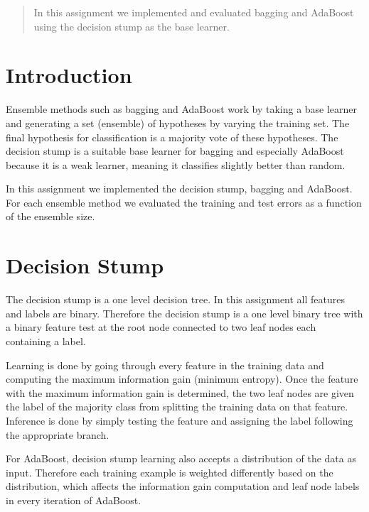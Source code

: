 \documentclass[12pt]{article}
\begin{document}
\maketitle

\begin{abstract}
In this assignment we implemented and evaluated bagging and AdaBoost using the decision stump as the base learner.
\end{abstract}

\section{Introduction}
Ensemble methods such as bagging and AdaBoost work by taking a base learner and generating a set (ensemble) of hypotheses by varying the training set. The final hypothesis for classification is a majority vote of these hypotheses. The decision stump is a suitable base learner for bagging and especially AdaBoost because it is a weak learner, meaning it classifies slightly better than random.

In this assignment we implemented the decision stump, bagging and AdaBoost. For each ensemble method we evaluated the training and test errors as a function of the ensemble size.

\section{Decision Stump}
The decision stump is a one level decision tree. In this assignment all features and labels are binary. Therefore the decision stump is a one level binary tree with a binary feature test at the root node connected to two leaf nodes each containing a label.

Learning is done by going through every feature in the training data and computing the maximum information gain (minimum entropy). Once the feature with the maximum information gain is determined, the two leaf nodes are given the label of the majority class from splitting the training data on that feature. Inference is done by simply testing the feature and assigning the label following the appropriate branch.

For AdaBoost, decision stump learning also accepts a distribution of the data as input. Therefore each training example is weighted differently based on the distribution, which affects the information gain computation and leaf node labels in every iteration of AdaBoost.
\end{document}
